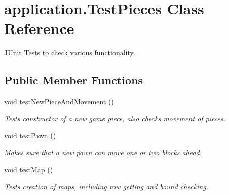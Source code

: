 \hypertarget{classapplication_1_1_test_pieces}{\section{application.\+Test\+Pieces Class Reference}
\label{classapplication_1_1_test_pieces}
}


J\+Unit Tests to check various functionality.  


\subsection*{Public Member Functions}
\begin{DoxyCompactItemize}
\item 
\hypertarget{classapplication_1_1_test_pieces_a094b2565c1fdc0e2e7922bba293177c3}{void \hyperlink{classapplication_1_1_test_pieces_a094b2565c1fdc0e2e7922bba293177c3}{test\+New\+Piece\+And\+Movement} ()}\label{classapplication_1_1_test_pieces_a094b2565c1fdc0e2e7922bba293177c3}

\begin{DoxyCompactList}\small\item\em Tests constructor of a new game piece, also checks movement of pieces. \end{DoxyCompactList}\item 
\hypertarget{classapplication_1_1_test_pieces_a189cac1b28dd55ca94d0258d4d4ec728}{void \hyperlink{classapplication_1_1_test_pieces_a189cac1b28dd55ca94d0258d4d4ec728}{test\+Pawn} ()}\label{classapplication_1_1_test_pieces_a189cac1b28dd55ca94d0258d4d4ec728}

\begin{DoxyCompactList}\small\item\em Makes sure that a new pawn can move one or two blocks ahead. \end{DoxyCompactList}\item 
\hypertarget{classapplication_1_1_test_pieces_ae60c7806e5644c400d5d3d1a44496fa3}{void \hyperlink{classapplication_1_1_test_pieces_ae60c7806e5644c400d5d3d1a44496fa3}{test\+Map} ()}\label{classapplication_1_1_test_pieces_ae60c7806e5644c400d5d3d1a44496fa3}

\begin{DoxyCompactList}\small\item\em Tests creation of maps, including row getting and bound checking. \end{DoxyCompactList}\end{DoxyCompactItemize}


